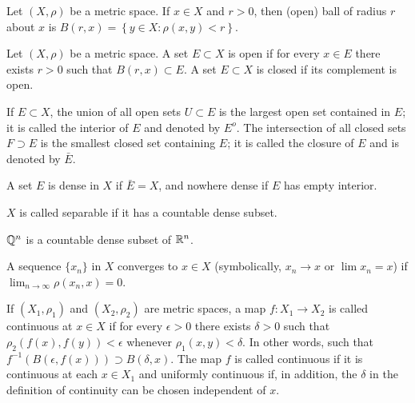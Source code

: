 \begin{definition}
    Let $(X, \rho)$ be a metric space.
    If $x \in X$ and $r > 0$, then (open) ball of radius $r$ about $x$ is $B(r, x) = \left\{ y \in X: \rho(x, y) < r \right\}$.
\end{definition}

\begin{definition}
    Let $(X, \rho)$ be a metric space.
    A set $E \subset X$ is open if for every $x \in E$ there exists $r > 0$ such that $B(r, x) \subset E$.
    A set $E \subset X$ is closed if its complement is open. 
\end{definition}

\begin{definition}
    If $E \subset X$, the union of all open sets $U \subset E$ is the largest open set contained in $E$; it is called the interior of $E$ and denoted by $E^o$.
    The intersection of all closed sets $F \supset E$ is the smallest closed set containing $E$; it is called the closure of $E$ and is denoted by $\bar{E}$.
\end{definition}

\begin{definition}
    A set $E$ is dense in $X$ if $\bar{E} = X$, and nowhere dense if $E$ has empty interior. 
\end{definition}

\begin{definition}
    $X$ is called separable if it has a countable dense subset.
\end{definition}

\begin{example}
    $\mathbb{Q}^n$ is a countable dense subset of $\mathbb{R}^n$.
\end{example}

\begin{definition}
    A sequence $\{ x_n \}$ in $X$ converges to $x \in X$ (symbolically, $x_n \to x$ or $\lim x_n = x$) if $\lim _{n \to \infty} \rho(x_n, x) = 0$.
\end{definition}

\begin{definition}[Continuity]
    If $(X_1, \rho_1)$ and $(X_2, \rho_2)$ are metric spaces, a map $f: X_1 \to X_2$ is called continuous at $x \in X$ if for every $\epsilon > 0$ there exists $\delta > 0$ such that $\rho_2(f(x), f(y)) < \epsilon$ whenever $\rho_1(x, y) < \delta$. 
    In other words, such that $f^{-1} \left( B(\epsilon, f(x)) \right) \supset B(\delta, x)$.
    The map $f$ is called continuous if it is continuous at each $x \in X_1$ and uniformly continuous if, in addition, the $\delta$ in the definition of continuity can be chosen independent of $x$.
\end{definition}


